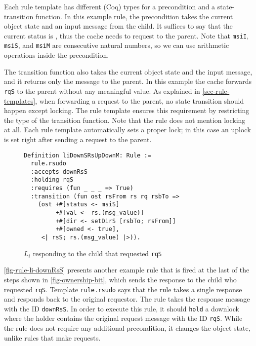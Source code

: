 \documentclass[sigplan,10pt,review,anonymous,screen]{acmart}\settopmatter{printfolios=true,printccs=false,printacmref=false}
\def\slstinline{\lstinline[basicstyle=\ttfamily\small]}
\begin{document}
Each rule template has different (Coq) types for a precondition and a state-transition function.
In this example rule, the precondition takes the current object state and an input message from the child.
It suffices to say that the current status is \stI{}, thus the cache needs to request to the parent.
Note that \slstinline{msiI}, \slstinline{msiS}, and \slstinline{msiM} are consecutive natural numbers, so we can use arithmetic operations inside the precondition.

The transition function also takes the current object state and the input message, and it returns only the message to the parent.
In this example the cache forwards \slstinline{rqS} to the parent without any meaningful value.
As explained in \autoref{sec-rule-templates}, when forwarding a request to the parent, no state transition should happen except locking.
The rule template ensures this requirement by restricting the type of the transition function.
Note that the rule does not mention locking at all.
Each rule template automatically sets a proper lock; in this case an uplock is set right after sending a request to the parent.

\begin{figure}[h]
  \centering
\begin{lstlisting}
Definition liDownSRsUpDownM: Rule :=
  rule.rsudo
  :accepts downRsS
  :holding rqS
  :requires (fun _ _ _ => True)
  :transition (fun ost rsFrom rs rq rsbTo =>
    (ost +#[status <- msiS]
         +#[val <- rs.(msg_value)]
         +#[dir <- setDirS [rsbTo; rsFrom]]
         +#[owned <- true],
     <| rsS; rs.(msg_value) |>)).
\end{lstlisting}
  \caption{$L_i$ responding to the child that requested \slstinline{rqS}}
  \label{fig-rule-li-downRsS}
\end{figure}

\autoref{fig-rule-li-downRsS} presents another example rule that is fired at the last of the steps shown in \autoref{fig-ownership-bit}, which sends the response to the child who requested \slstinline{rqS}.
Template \slstinline{rule.rsudo} says that the rule takes a single response and responds back to the original requestor.
The rule takes the response message with the ID \slstinline{downRsS}.
In order to execute this rule, it should \slstinline{hold} a downlock where the holder contains the original request message with the ID \slstinline{rqS}.
While the rule does not require any additional precondition, it changes the object state, unlike rules that make requests.
\end{document}
